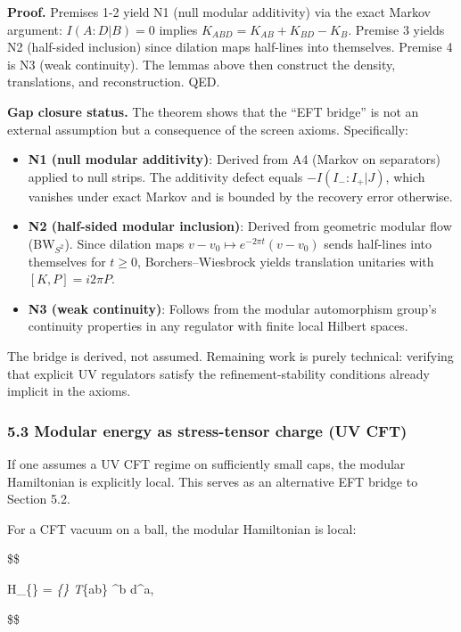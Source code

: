\documentclass[11pt,a4paper]{article}
\theoremstyle{remark}
\begin{document}
\textbf{Proof.} Premises 1-2 yield N1 (null modular additivity) via the exact
Markov argument: \(I(A:D|B)=0\) implies \(K_{ABD} = K_{AB} + K_{BD} - K_B\).
Premise 3 yields N2 (half-sided inclusion) since dilation maps half-lines
into themselves. Premise 4 is N3 (weak continuity). The lemmas above then
construct the density, translations, and reconstruction. QED.

\textbf{Gap closure status.} The theorem shows that the ``EFT bridge'' is not an
external assumption but a consequence of the screen axioms. Specifically:

\begin{itemize}
\item
  \textbf{N1 (null modular additivity)}: Derived from A4 (Markov on separators)
  applied to null strips. The additivity defect equals \(-I(I_-:I_+|J)\),
  which vanishes under exact Markov and is bounded by the recovery error
  otherwise.
\item
  \textbf{N2 (half-sided modular inclusion)}: Derived from geometric modular flow
  (BW\(_{S^2}\)). Since dilation maps \(v - v_0 \mapsto e^{-2\pi t}(v - v_0)\)
  sends half-lines into themselves for \(t \ge 0\), Borchers--Wiesbrock yields
  translation unitaries with \([K, P] = i2\pi P\).
\item
  \textbf{N3 (weak continuity)}: Follows from the modular automorphism group's
  continuity properties in any regulator with finite local Hilbert spaces.
\end{itemize}

The bridge is derived, not assumed. Remaining work is purely technical:
verifying that explicit UV regulators satisfy the refinement-stability
conditions already implicit in the axioms.

\subsubsection{5.3 Modular energy as stress-tensor charge (UV CFT)}\label{modular-energy-as-stress-tensor-charge-uv-cft}

If one assumes a UV CFT regime on sufficiently small caps, the modular
Hamiltonian is explicitly local. This serves as an alternative EFT bridge to
Section 5.2.

For a CFT vacuum on a ball, the modular Hamiltonian is local:

\$\$

H\_\{\zeta\} = \int\emph{\{\Sigma\} T}\{ab\} \zeta\^{}b d\Sigma\^{}a,

\$\$
\end{document}
